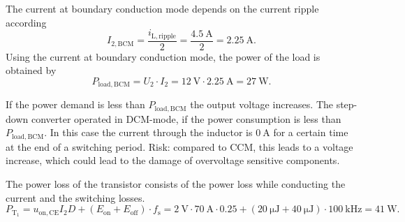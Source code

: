 

\begin{solutionblock}
    The current at boundary conduction mode depends on the current ripple according
    \begin{equation*}
       I_\mathrm{2,BCM}=\frac{i_\mathrm{L,ripple}}{2} =\frac{\SI{4.5}{\ampere}}{2}=\SI{2.25}{\ampere}.
       \label{eq:i_bcm}
    \end{equation*}
    Using the current at boundary conduction mode, the power of the load is obtained by 
    \begin{equation*}
        P_\mathrm{load,BCM}=U_\mathrm{2} \cdot I_\mathrm{2}=\SI{12}{\volt} \cdot \SI{2.25}{\ampere}=\SI{27}{\watt}.
        \label{eq:p_bcm}
    \end{equation*}
\end{solutionblock}
    
%

\begin{solutionblock}
    If the power demand is less than $P_\mathrm{load,BCM}$ the output voltage increases. 
    The step-down converter operated in DCM-mode, if the power consumption is less than $P_\mathrm{load,BCM}$. In this case the current through the inductor is $\SI{0}{\ampere}$ for a certain time at the end of a switching period.
    Risk: compared to CCM, this leads to a voltage increase, which could lead to the damage of overvoltage sensitive components.
\end{solutionblock}
    
%


\begin{solutionblock}
    The power loss of the transistor consists of the power loss while conducting the current and the switching losses.
    \begin{equation*}
        P_\mathrm{T_1}=u_\mathrm{on,CE} I_\mathrm{2} D + \left( E_\mathrm{on}+E_\mathrm{off} \right) \cdot f_\mathrm{s}
        = \SI{2}{\volt} \cdot \SI{70}{\ampere} \cdot 0.25 + \left( \SI{20}{\micro\joule} + \SI{40}{\micro\joule} \right) 
        \cdot \SI{100}{\kilo\hertz} = \SI{41}{\watt}.
        \label{eq:p_IGBT}
    \end{equation*}
\end{solutionblock}



